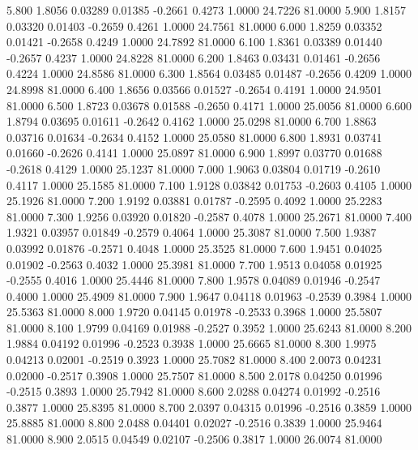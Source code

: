   5.800   1.8056   0.03289   0.01385  -0.2661   0.4273   1.0000  24.7226  81.0000
   5.900   1.8157   0.03320   0.01403  -0.2659   0.4261   1.0000  24.7561  81.0000
   6.000   1.8259   0.03352   0.01421  -0.2658   0.4249   1.0000  24.7892  81.0000
   6.100   1.8361   0.03389   0.01440  -0.2657   0.4237   1.0000  24.8228  81.0000
   6.200   1.8463   0.03431   0.01461  -0.2656   0.4224   1.0000  24.8586  81.0000
   6.300   1.8564   0.03485   0.01487  -0.2656   0.4209   1.0000  24.8998  81.0000
   6.400   1.8656   0.03566   0.01527  -0.2654   0.4191   1.0000  24.9501  81.0000
   6.500   1.8723   0.03678   0.01588  -0.2650   0.4171   1.0000  25.0056  81.0000
   6.600   1.8794   0.03695   0.01611  -0.2642   0.4162   1.0000  25.0298  81.0000
   6.700   1.8863   0.03716   0.01634  -0.2634   0.4152   1.0000  25.0580  81.0000
   6.800   1.8931   0.03741   0.01660  -0.2626   0.4141   1.0000  25.0897  81.0000
   6.900   1.8997   0.03770   0.01688  -0.2618   0.4129   1.0000  25.1237  81.0000
   7.000   1.9063   0.03804   0.01719  -0.2610   0.4117   1.0000  25.1585  81.0000
   7.100   1.9128   0.03842   0.01753  -0.2603   0.4105   1.0000  25.1926  81.0000
   7.200   1.9192   0.03881   0.01787  -0.2595   0.4092   1.0000  25.2283  81.0000
   7.300   1.9256   0.03920   0.01820  -0.2587   0.4078   1.0000  25.2671  81.0000
   7.400   1.9321   0.03957   0.01849  -0.2579   0.4064   1.0000  25.3087  81.0000
   7.500   1.9387   0.03992   0.01876  -0.2571   0.4048   1.0000  25.3525  81.0000
   7.600   1.9451   0.04025   0.01902  -0.2563   0.4032   1.0000  25.3981  81.0000
   7.700   1.9513   0.04058   0.01925  -0.2555   0.4016   1.0000  25.4446  81.0000
   7.800   1.9578   0.04089   0.01946  -0.2547   0.4000   1.0000  25.4909  81.0000
   7.900   1.9647   0.04118   0.01963  -0.2539   0.3984   1.0000  25.5363  81.0000
   8.000   1.9720   0.04145   0.01978  -0.2533   0.3968   1.0000  25.5807  81.0000
   8.100   1.9799   0.04169   0.01988  -0.2527   0.3952   1.0000  25.6243  81.0000
   8.200   1.9884   0.04192   0.01996  -0.2523   0.3938   1.0000  25.6665  81.0000
   8.300   1.9975   0.04213   0.02001  -0.2519   0.3923   1.0000  25.7082  81.0000
   8.400   2.0073   0.04231   0.02000  -0.2517   0.3908   1.0000  25.7507  81.0000
   8.500   2.0178   0.04250   0.01996  -0.2515   0.3893   1.0000  25.7942  81.0000
   8.600   2.0288   0.04274   0.01992  -0.2516   0.3877   1.0000  25.8395  81.0000
   8.700   2.0397   0.04315   0.01996  -0.2516   0.3859   1.0000  25.8885  81.0000
   8.800   2.0488   0.04401   0.02027  -0.2516   0.3839   1.0000  25.9464  81.0000
   8.900   2.0515   0.04549   0.02107  -0.2506   0.3817   1.0000  26.0074  81.0000

